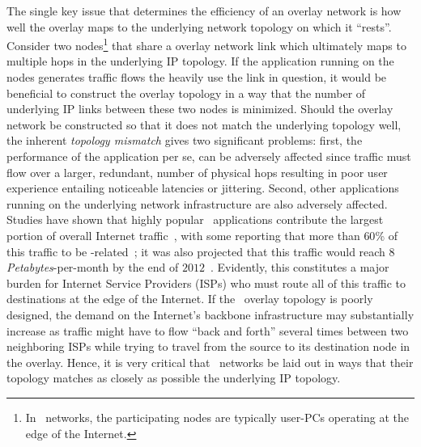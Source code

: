 The single key issue that determines the efficiency of an overlay network
is how well the overlay maps to the underlying network topology on which it
``rests''. 
Consider two nodes\footnote{In \p\ networks,
the participating nodes are typically user-PCs operating at the edge of the
Internet.} that share a overlay network link which ultimately 
maps to multiple hops in the underlying IP topology. 
If the application running on the nodes generates traffic flows 
the heavily use the link in question, it would be beneficial to 
construct the overlay topology in a way that the number of 
underlying IP links between these two nodes is minimized. 
Should the overlay network be constructed  so that 
it does not match the underlying topology well, 
the inherent \emph{topology mismatch} gives two
significant problems: first, the performance of the application per se, can be
adversely affected since traffic must flow over a larger,
redundant, number of physical hops resulting in poor user experience 
entailing noticeable latencies or jittering. 
Second, other applications running
on the underlying network infrastructure are also adversely affected.
Studies have shown that highly popular \p\ applications contribute 
the largest portion of overall 
Internet traffic~\cite{seroiu_analysiscds_2002,sen_analyzep2ptraffic_2004,krp_ispfear_2005}, with some reporting that more than $60$\% of this traffic 
to be \p-related~\cite{cachelogic,ipoque2007,ipoque2009};
it was also projected that this traffic would reach
$8\;$\emph{Petabytes}-per-month by the end of $2012$~\cite{multinteligence}. 
Evidently, this constitutes a major burden for 
Internet Service Providers (ISPs) who must route 
all of this traffic to destinations at the edge of the Internet. 
If the \p\ overlay topology is poorly designed, 
the demand on the Internet's backbone infrastructure may 
substantially increase as traffic might have to flow
``back and forth'' several times between two neighboring ISPs 
while trying to travel from the source to its destination node
in the overlay.
Hence, it is very critical that \p\ networks be laid out 
in ways that their topology matches as closely as possible the 
underlying IP topology.

